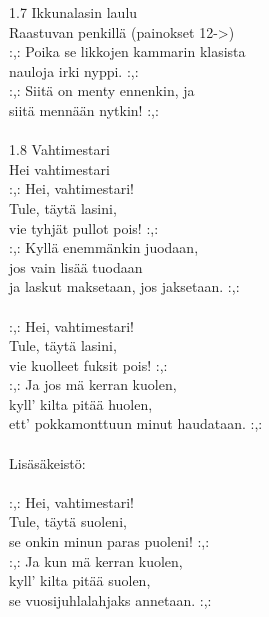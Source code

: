1.7 Ikkunalasin laulu \\
Raastuvan penkillä (painokset 12->) \\
            :,: Poika se likkojen kammarin klasista \\
            nauloja irki nyppi. :,: \\
            :,: Siitä on menty ennenkin, ja \\
            siitä mennään nytkin! :,: \\
\hspace{10mm} \\
1.8 Vahtimestari \\
Hei vahtimestari \\
            :,: Hei, vahtimestari! \\
            Tule, täytä lasini, \\
            vie tyhjät pullot pois! :,: \\
            :,: Kyllä enemmänkin juodaan, \\
            jos vain lisää tuodaan \\
            ja laskut maksetaan, jos jaksetaan. :,: \\
\hspace{10mm} \\
            :,: Hei, vahtimestari! \\
            Tule, täytä lasini, \\
            vie kuolleet fuksit pois! :,: \\
            :,: Ja jos mä kerran kuolen, \\
            kyll' kilta pitää huolen, \\
            ett' pokkamonttuun minut haudataan. :,: \\
\hspace{10mm} \\
            Lisäsäkeistö: \\
\hspace{10mm} \\
            :,: Hei, vahtimestari! \\
            Tule, täytä suoleni, \\
            se onkin minun paras puoleni! :,: \\
            :,: Ja kun mä kerran kuolen,  \\
            kyll’ kilta pitää suolen,  \\
            se vuosijuhlalahjaks annetaan. :,: \\
\hspace{10mm} \\
